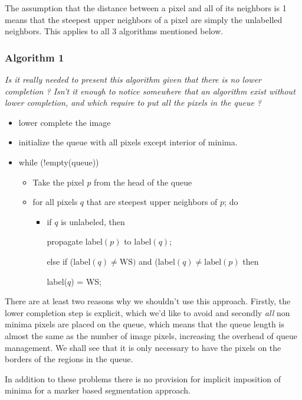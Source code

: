 \documentclass{InsightArticle}
\begin{document}
The assumption that the distance between a pixel and all of its
neighbors is 1 means that the steepest upper neighbors of a pixel are
simply the unlabelled neighbors. This applies to all 3 algorithms
mentioned below.

\subsubsection{Algorithm 1}

{\em Is it really needed to present this algorithm given that there is
no lower completion ? Isn't it enough to notice somewhere that an
algorithm exist without lower completion, and which require to put
all the pixels in the queue ?}

\begin{itemize}
\item lower complete the image
\item initialize the queue with all pixels except interior of minima.
\item while (!empty(queue))
   \begin{itemize}
	\item Take the pixel $p$ from the head of the queue
        \item for all pixels $q$ that are steepest upper neighbors of $p$; do
        \begin{itemize}
         \item  if $q$ is unlabeled, then 

propagate label$(p)$ to label$(q)$;

                else if (label$(q) \ne \mbox{WS})$ and  (label$(q) \ne \mbox{label}(p)$ then

                  label($q$) = WS;
	\end{itemize}

   \end{itemize}
\end{itemize}

There are at least two reasons why we shouldn't use this
approach. Firstly, the lower completion step is explicit, which we'd
like to avoid and secondly {\em all} non minima pixels are placed on the
queue, which means that the queue length is almost the same as the
number of image pixels, increasing the overhead of queue
management. We shall see that it is only necessary to have the pixels
on the borders of the regions in the queue.

In addition to these problems there is no provision for implicit
imposition of minima for a marker based segmentation approach.
\end{document}

